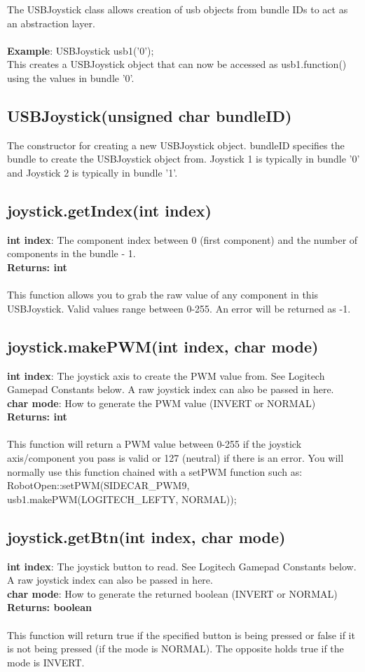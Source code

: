 \documentclass[11pt]{article} %
\begin{document}
The USBJoystick class allows creation of usb objects from bundle IDs to act as an abstraction layer.\\\\ \textbf{Example}: USBJoystick usb1('0');\\
This creates a USBJoystick object that can now be accessed as usb1.function() using the values in bundle '0'.

\subsection{USBJoystick(unsigned char bundleID)}
The constructor for creating a new USBJoystick object. bundleID specifies the bundle to create the USBJoystick object from. Joystick 1 is typically in bundle '0' and Joystick 2 is typically in bundle '1'.
\subsection{joystick.getIndex(int index)}
\textbf{int index}: The component index between 0 (first component) and the number of components in the bundle - 1.\\
\textbf{Returns: int}\\\\
This function allows you to grab the raw value of any component in this USBJoystick. Valid values range between 0-255. An error will be returned as -1.
\subsection{joystick.makePWM(int index, char mode)}
\textbf{int index}: The joystick axis to create the PWM value from. See Logitech Gamepad Constants below. A raw joystick index can also be passed in here.\\
\textbf{char mode}: How to generate the PWM value (INVERT or NORMAL)\\
\textbf{Returns: int}\\\\
This function will return a PWM value between 0-255 if the joystick axis/component you pass is valid or 127 (neutral) if there is an error. You will normally use this function chained with a setPWM function such as:\\
RobotOpen::setPWM(SIDECAR\_PWM9, usb1.makePWM(LOGITECH\_LEFTY, NORMAL));
\subsection{joystick.getBtn(int index, char mode)}
\textbf{int index}: The joystick button to read. See Logitech Gamepad Constants below. A raw joystick index can also be passed in here.\\
\textbf{char mode}: How to generate the returned boolean (INVERT or NORMAL)\\
\textbf{Returns: boolean}\\\\
This function will return true if the specified button is being pressed or false if it is not being pressed (if the mode is NORMAL). The opposite holds true if the mode is INVERT.
\end{document}
